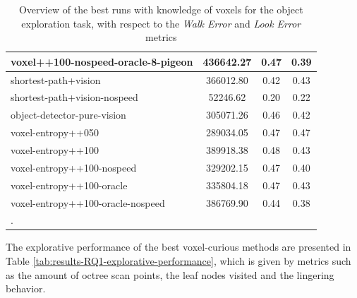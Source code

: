 \begin{longtable}{|l|c|c|c|}
voxel++100-nospeed-oracle-8-pigeon & 436642.27 & {\cellcolor[HTML]{E3EFEC}} \color[HTML]{000000} 0.47 & {\cellcolor[HTML]{B6D9D1}} \color[HTML]{000000} 0.39 \\ \hline
shortest-path+vision & 366012.80 & {\cellcolor[HTML]{CCE3DE}} \color[HTML]{000000} 0.42 & {\cellcolor[HTML]{D2E6E2}} \color[HTML]{000000} 0.43 \\ \hline
shortest-path+vision-nospeed & 52246.62 & {\cellcolor[HTML]{55AA99}} \color[HTML]{F1F1F1} 0.20 & {\cellcolor[HTML]{55AA99}} \color[HTML]{F1F1F1} 0.22 \\ \hline
object-detector-pure-vision & 305071.26 & {\cellcolor[HTML]{DEECE9}} \color[HTML]{000000} 0.46 & {\cellcolor[HTML]{C9E2DC}} \color[HTML]{000000} 0.42 \\ \hline
voxel-entropy++050 & 289034.05 & {\cellcolor[HTML]{E3EFEC}} \color[HTML]{000000} 0.47 & {\cellcolor[HTML]{E7F0EE}} \color[HTML]{000000} 0.47 \\ \hline
voxel-entropy++100 & 389918.38 & {\cellcolor[HTML]{EBF2F0}} \color[HTML]{000000} 0.48 & {\cellcolor[HTML]{D4E7E3}} \color[HTML]{000000} 0.43 \\ \hline
voxel-entropy++100-nospeed & 329202.15 & {\cellcolor[HTML]{E5EFED}} \color[HTML]{000000} 0.47 & {\cellcolor[HTML]{C1DED8}} \color[HTML]{000000} 0.40 \\ \hline
voxel-entropy++100-oracle & 335804.18 & {\cellcolor[HTML]{E3EFEC}} \color[HTML]{000000} 0.47 & {\cellcolor[HTML]{D1E6E1}} \color[HTML]{000000} 0.43 \\ \hline
voxel-entropy++100-oracle-nospeed & 386769.90 & {\cellcolor[HTML]{D5E8E4}} \color[HTML]{000000} 0.44 & {\cellcolor[HTML]{B6D8D1}} \color[HTML]{000000} 0.38 \\ \hline

    \caption{Overview of the best runs with knowledge of voxels for the object exploration task, with respect to the \textit{Walk Error} and \textit{Look Error} metrics}.
    \label{tab:results-RQ1-walkLook}
\end{longtable}

The explorative performance of the best voxel-curious methods are presented in Table \ref{tab:results-RQ1-explorative-performance}, which is given by metrics such as the amount of octree scan points, the leaf nodes visited and the lingering behavior.


